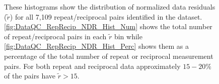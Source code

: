 \documentclass[final,authoryear,5p,times,twocolumn]{elsarticle}
\begin{document}
\begin{figure} [!ht]
\begin{center}
\end{center}
\caption{These histograms show the distribution of normalized data residuals ($\tilde{r}$) for all 7,109 repeat/reciprocal pairs identified in the dataset. \ref{fig:DataQC_RepRecip_NDR_Hist_Num} shows the total number of repeat/reciprocal pairs in each $\tilde{r}$ bin while \ref{fig:DataQC_RepRecip_NDR_Hist_Perc} shows them as a percentage of the total number of repeat or reciprocal measurement pairs. For both repeat and reciprocal data approximately $15 - 20\%$ of the pairs have $\tilde{r} > 15$.}
\label{fig:DataQC_RepRecip_NDR_Hist}
\end{figure}
\end{document}
